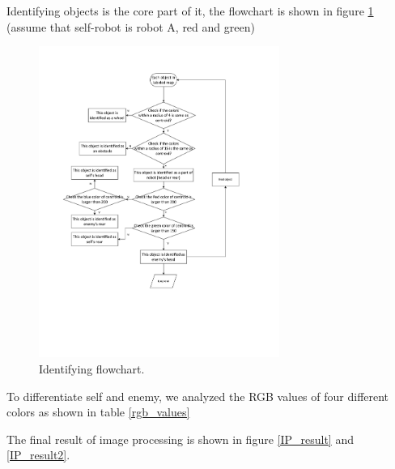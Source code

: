 Identifying objects is the core part of it, the flowchart is shown in figure \ref{Id_flow} (assume that self-robot is robot A, red and green)

\begin{figure}[thb]
    \centering
    \includegraphics[width=0.7\textwidth]{images/Id_flow.pdf}
    \caption[Identifying flowchart]{Identifying flowchart.}\label{Id_flow}
\end{figure}

To differentiate self and enemy, we analyzed the RGB values of four different colors as shown in table \ref{rgb_values}


The final result of image processing is shown in figure \ref{IP_result} and \ref{IP_result2}.

